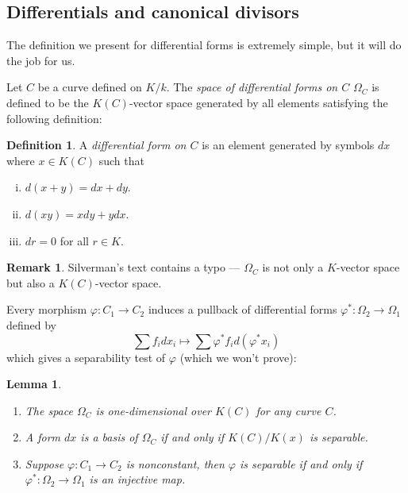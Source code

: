 \documentclass[12pt]{article}
\newtheorem{lemma}{Lemma}[subsection]
\theoremstyle{remark}
\theoremstyle{definition}
\newtheorem{remark}{Remark}[subsection]
\newtheorem{definition}{Definition}[subsection]
\begin{document}
        \subsection{Differentials and canonical divisors}\label{ssec-differential}
            The definition we present for differential forms is extremely simple, but it will do the job for us.
    
            Let $C$ be a curve defined on $K/k$. The \textit{space of differential forms on $C$} $\Omega_C$ is defined to be the $K(C)$-vector space generated by all elements satisfying the following definition:
            \begin{definition}
                A \textit{differential form on $C$} is an element generated by symbols $dx$ where $x\in K(C)$ such that
                \begin{enumerate}[(i)]
                    \item $d(x+y)=dx+dy$.
                    \item $d(xy)=xdy+ydx$.
                    \item $dr=0$ for all $r\in K$.
                \end{enumerate}
            \end{definition}
            \begin{remark}
                Silverman's text contains a typo --- $\Omega_C$ is not only a $K$-vector space but also a $K(C)$-vector space.
            \end{remark}
            Every morphism $\varphi:C_1\to C_2$ induces a pullback of differential forms $\varphi^*:\Omega_2\to\Omega_1$ defined by
            \[\sum f_idx_i\mapsto \sum \varphi^*f_id\left(\varphi^*x_i\right)\]
            which gives a separability test of $\varphi$ (which we won't prove):
            \begin{lemma}\label{lemma-sep-criteria}
                \begin{enumerate}[\normalfont(i)]
                    \item The space $\Omega_C$ is one-dimensional over $K(C)$ for any curve $C$.
                    \item A form $dx$ is a basis of $\Omega_C$ if and only if $K(C)/K(x)$ is separable.
                    \item Suppose $\varphi:C_1\to C_2$ is nonconstant, then $\varphi$ is separable if and only if $\varphi^*:\Omega_2\to\Omega_1$ is an injective map.
                \end{enumerate}
            \end{lemma}
\end{document}
